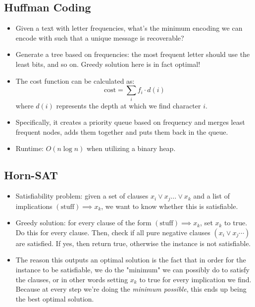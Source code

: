 \documentclass[10pt]{article}
\newcommand{\cost}{\mathrm{cost}}
\begin{document}
	\subsection{Huffman Coding}
	\begin{itemize}
		\item Given a text with letter frequencies, what's the minimum encoding we can encode with such that 
			a unique message is recoverable?
		\item Generate a tree based on frequencies: the most frequent letter should use the least bits, and 
			so on. Greedy solution here is in fact optimal!
		\item The cost function can be calculated as:
			\[
			\cost = \sum_i f_i \cdot d(i)
			\] 
			where \( d(i) \) represents the depth at which we find character \( i \).  
		\item Specifically, it creates a priority queue based on frequency and merges least frequent 
			nodes, adds them together and puts them back in the queue. 
		\item Runtime: \( O(n \log n) \) when utilizing a binary heap. 
	\end{itemize}
	\subsection{Horn-SAT}
	\begin{itemize}
		\item Satisfiability problem: given a set of clauses \( x_i \lor x_j \dots \lor x_k \) and a list 
			of implications \( (\text{stuff}) \implies x_k \), we want to know whether this is satisfiable.
		\item Greedy solution: for every clause of the form \( (\text{stuff}) \implies x_k \), set 
			\( x_k \) to true. Do this for every clause. Then, check if all pure negative clauses 
			\( (x_i \lor x_j \cdots) \) are satisfied. If yes, then return true, otherwise the instance is 
			not satisfiable. 
		\item The reason this outputs an optimal solution is the fact that in order for the instance to be satisfiable, we 
			do the "minimum" we can possibly do to satisfy the clauses, or in other words setting \( x_k \) to true for every 
			implication we find. Because at every step we're doing the \textit{minimum possible}, this ends up being 
			the best optimal solution. 
	\end{itemize}
\end{document}
